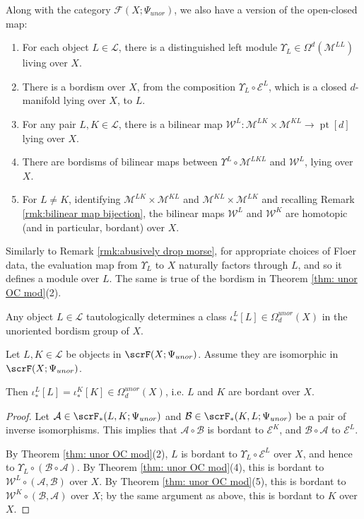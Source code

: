\documentclass{TPmod}
\newcommand{\pt}{\operatorname{pt}}
\newcommand{\cA}{\mathcal{A}}
\newcommand{\cB}{\mathcal{B}}
\newcommand{\cE}{\mathcal{E}}
\newcommand{\cF}{\mathcal{F}}
\newcommand{\cL}{\mathcal{L}}
\newcommand{\cM}{\mathcal{M}}
\newcommand{\cW}{\mathcal{W}}
\numberwithin{equation}{section}
\begin{document}
    Along with the category $\cF(X; \Psi_{unor})$, we also have a version of the open-closed map:
    \begin{thm}[{\cite[Section 7.6]{PS}}]\label{thm: unor OC mod}
        \begin{enumerate}
            \item For each object $L \in \cL$, there is a distinguished left module $\Upsilon_L \in \Omega^d(\cM^{LL})$ living over $X$.
            \item There is a bordism over $X$, from the composition $\Upsilon_L \circ \cE^L$, which is a closed $d$-manifold lying over $X$, to $L$.
            \item For any pair $L, K \in \cL$, there is a bilinear map $\cW^L: \cM^{LK} \times \cM^{KL} \to \pt[d]$ lying over $X$.
            \item There are bordisms of bilinear maps between $\Upsilon^L \circ \cM^{LKL}$ and $\cW^L$, lying over $X$.
            \item For $L \neq K$, identifying $\cM^{LK} \times \cM^{KL}$ and $\cM^{KL} \times \cM^{LK}$ and recalling Remark \ref{rmk:bilinear map bijection}, the bilinear maps $\cW^L$ and $\cW^K$ are homotopic (and in particular, bordant) over $X$.
        \end{enumerate}
    \end{thm}
    \begin{rmk}\label{rmk: ups fact}
        Similarly to Remark \ref{rmk:abusively drop morse}, for appropriate choices of Floer data, the evaluation map from $\Upsilon_L$ to $X$ naturally factors through $L$, and so it defines a module over $L$. The same is true of the bordism in Theorem \ref{thm: unor OC mod}(2).
    \end{rmk}
 
    Any object $L \in \cL$ tautologically determines a class $\iota^L_*[L] \in \Omega^{unor}_d(X)$ in the unoriented bordism group of $X$.
    \begin{lem}\label{lem: OC same fund unor}
        Let $L, K \in \cL$ be objects in $\scrF(X; \Psi_{unor})$. Assume they are isomorphic in $\scrF(X; \Psi_{unor})$. 

        Then $\iota^L_*[L]=\iota^K_*[K] \in \Omega^{unor}_d(X)$, i.e. $L$ and $K$ are bordant over $X$.
    \end{lem}
    \begin{proof}
        Let $\cA \in \scrF_*(L, K; \Psi_{unor})$ and $\cB \in \scrF_*(K, L; \Psi_{unor})$ be a pair of inverse isomorphisms. This implies that $\cA \circ \cB$ is bordant to $\cE^K$, and $\cB \circ \cA$ to $\cE^L$.

        By Theorem \ref{thm: unor OC mod}(2), $L$ is bordant to $\Upsilon_L \circ \cE^L$ over $X$, and hence to $\Upsilon_L \circ (\cB \circ \cA)$. By Theorem \ref{thm: unor OC mod}(4), this is bordant to $\cW^L \circ (\cA, \cB)$ over $X$. By Theorem \ref{thm: unor OC mod}(5), this is bordant to $\cW^K \circ (\cB, \cA)$ over $X$; by the same argument as above, this is bordant to $K$ over $X$.
    \end{proof}
\end{document}
